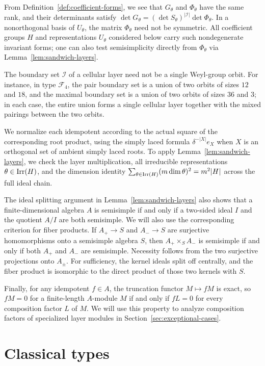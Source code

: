 \documentclass[11pt,a4paper]{amsart}
\theoremstyle{uprightdefinition}
\theoremstyle{remark}\newtheorem{remark}[theorem]{Remark}
\begin{document}
From Definition~\ref{def:coefficient-forms}, we see that $G_\theta$ and $\Phi_\theta$ have the same rank, and their
determinants satisfy $\det G_\theta=(\det S_\theta)^{|\mathcal I|}\det\Phi_\theta$.
In a nonorthogonal basis of $U_\theta$, the matrix $\Phi_\theta$ need not be symmetric.
All coefficient groups $H$ and representations $U_\theta$ considered below carry such nondegenerate invariant forms; one can also test
semisimplicity directly from $\Phi_\theta$ via
Lemma~\ref{lem:sandwich-layers}.

The boundary set $\mathcal I$ of a cellular layer need not be a single Weyl-group orbit.
For instance, in type $\mathscr{F}_4$, the pair boundary set is a union of two orbits of sizes $12$ and $18$, and the
maximal boundary set is a union of two orbits of sizes $36$ and $3$; in each case, the entire union forms a single cellular
layer together with the mixed pairings between the two orbits.

We normalize each idempotent according to the actual square of the corresponding root product, using the simply laced formula $\delta^{-|X|}e_X$ when $X$ is an orthogonal set of ambient simply laced roots.
To apply Lemma~\ref{lem:sandwich-layers}, we check the layer multiplication,
all irreducible representations $\theta\in\operatorname{Irr}(H)$, and the dimension identity $\sum_{\theta\in\operatorname{Irr}(H)}(m\dim\theta)^2=m^2|H|$ across the full ideal chain.

The ideal splitting argument in Lemma~\ref{lem:sandwich-layers} also shows that
a finite-dimensional algebra $A$ is semisimple if and only if a two-sided ideal $I$
and the quotient $A/I$ are both semisimple. We will also use the corresponding
criterion for fiber products. If $A_+\to S$ and $A_-\to S$ are surjective
homomorphisms onto a semisimple algebra $S$, then $A_+\times_S A_-$ is
semisimple if and only if both $A_+$ and $A_-$ are semisimple.
Necessity follows from the two surjective projections onto $A_\pm$.
For sufficiency, the kernel ideals split off centrally, and the fiber product
is isomorphic to the direct product of those two kernels with $S$.

Finally, for any idempotent
$f\in A$, the truncation functor $M\mapsto fM$ is exact, so $fM=0$ for a finite-length $A$-module $M$ if and only if $fL=0$ for
every composition factor $L$ of $M$. We will use this property to analyze composition factors of specialized layer modules in Section~\ref{sec:exceptional-cases}.


\section{Classical types}
\label{sec:classical-cases}
\end{document}
